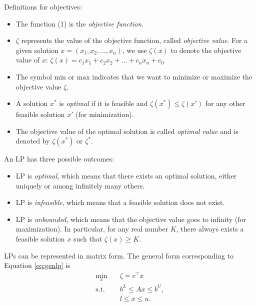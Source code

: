 Definitions for objectives:
\begin{itemize}
    \item The function (1) is the \emph{objective function}.
    \item $\zeta$ represents the value of the objective 
    function, called \emph{objective value}. For a given 
    solution $x = (x_1, x_2, \dots, x_n)$, we use $\zeta(x)$ to
    denote the objective value of $x$:
    $\zeta(x) = c_1x_1 + c_2x_2 + \dots + c_nx_n + c_0$
    \item The symbol $\text{min}$ or $\text{max}$ indicates 
    that we want to minimize or maximize the objective value $\zeta$. 
    \item A solution $x^*$ is \emph{optimal} if it is feasible and 
    $\zeta(x^*) \leq \zeta(x')$ for any other feasible solution $x'$
    (for minimization).
    \item The objective value of the optimal solution is called 
    \emph{optimal value} and is denoted by $\zeta(x^*)$ or $\zeta^*$.
\end{itemize}

An LP has three possible outcomes:
\begin{itemize}
    \item LP is \emph{optimal}, which means that there exists an optimal solution,
    either uniquely or among infinitely many others.
    \item LP is \emph{infeasible}, which means that a feasible solution does not
    exist.
    \item LP is \emph{unbounded}, which means that the objective value goes to
    infinity (for maximization). In particular, for any real number $K$,
    there always exists a feasible solution $x$ such that $\zeta(x) \geq K$.
\end{itemize}

LPs can be represented in matrix form. The 
general form corresponding to Equation \ref{eq:genlp}
is 
\[
\begin{aligned}
\min_{x}\quad & \zeta = c^\top x \\
\text{s.t.}\quad & b^L \le Ax \le b^U, \\
& l \le x \le u.
\end{aligned}
\]

